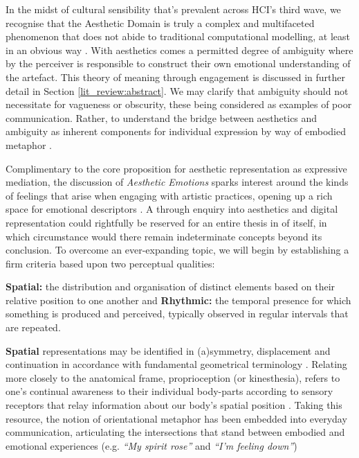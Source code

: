 In the midst of cultural sensibility that's prevalent across HCI's third wave, we recognise that the Aesthetic Domain is truly a complex and multifaceted phenomenon that does not abide to traditional computational modelling, at least in an obvious way \cite{bardzell_interaction_2009, rentschler_innate_1999}. With aesthetics comes a permitted degree of ambiguity where by the perceiver is responsible to construct their own emotional understanding of the artefact. This theory of meaning through engagement is discussed in further detail in Section \ref{lit_review:abstract}. We may clarify that ambiguity should not necessitate for vagueness or obscurity, these being considered as examples of poor communication. Rather, to understand the bridge between aesthetics and ambiguity as inherent components for individual expression by way of embodied metaphor \cite{dauden_roquet_body_2020,lakoff_metaphors_2003}. 

Complimentary to the core proposition for aesthetic representation as expressive mediation, the discussion of \textit{Aesthetic Emotions} sparks interest around the kinds of feelings that arise when engaging with artistic practices, opening up a rich space for emotional descriptors \cite{schindler_measuring_2017,fingerhut_aesthetic_2020}. A through enquiry into aesthetics and digital representation could rightfully be reserved for an entire thesis in of itself, in which circumstance would there remain indeterminate concepts beyond its conclusion. To overcome an ever-expanding topic, we will begin by establishing a firm criteria based upon two perceptual qualities:

\textbf{Spatial:} the distribution and organisation of distinct elements based on their relative position to one another and \textbf{Rhythmic:} the temporal presence for which something is produced and perceived, typically observed in regular intervals that are repeated.

\textbf{Spatial} representations may be identified in (a)symmetry, displacement and continuation in accordance with fundamental geometrical terminology \cite{mcmanus_symmetry_2005,boselie_general_1984}. Relating more closely to the anatomical frame, proprioception (or kinesthesia), refers to one's continual awareness to their individual body-parts according to sensory receptors that relay information about our body's spatial position \cite{lamkin-kennard_sensors_2019}. Taking this resource, the notion of orientational metaphor has been embedded into everyday communication, articulating the intersections that stand between embodied and emotional experiences \citep{gow_spatial_2001,zlatev_phenomenology_2010} (e.g. \textit{“My spirit rose”} and \textit{“I’m feeling down”})

